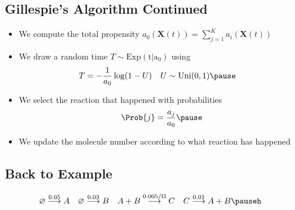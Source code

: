 
\begin{slide}
\section{Gillespie's Algorithm Continued}

\begin{PauseHighLight}
  \begin{itemize}
  \item We compute the total propensity $a_0(\bm{X}(t)) = \sum_{j=1}^K
    a_i(\bm{X}(t))$\pause
  \item We draw a random time $T\sim \mathrm{Exp(t|a_0)}$ using
    \begin{align*}
      T &= - \frac{1}{a_0} \log(1-U) & U&\sim\mathrm{Uni}(0,1)\pause
    \end{align*}
  \item We select the reaction that happened with probabilities
    \begin{align*}
      \Prob{j} = \frac{a_j}{a_0}\pause
    \end{align*}
  \item We update the molecule number according to what reaction has
    happened\pause
  \end{itemize}
\end{PauseHighLight}

\end{slide}


\begin{slide}
\section[-3]{Back to Example}

\pb
\begin{align*}
  \varnothing &\goesto{0.05} A  &
  \varnothing &\goesto{0.03} B & 
  A + B &\goesto{0.005/\Omega} C &
  C &\goesto{0.01} A + B\pauseh
\end{align*}
\vspace*{-1cm}
\begin{center}
  \pause
\end{center}

\end{slide}



